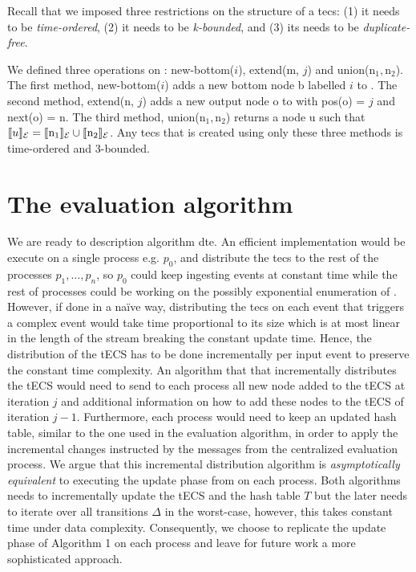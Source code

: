 Recall that we imposed three restrictions on the structure of a \acrshort{tecs}: (1) it needs to be \emph{time-ordered}, (2) it needs to be \emph{k-bounded}, and (3) its needs to be \emph{duplicate-free}.

We defined three operations on \tecs: new-bottom($i$), extend(m, $j$) and union($\text{n}_{1},\text{n}_{2}$). The first method, new-bottom($i$) adds a new bottom node b labelled $i$ to \tecs. The second method, extend(n, $j$) adds a new output node o to \tecs with pos(o) = $j$ and next(o) = n. The third method, union($\text{n}_{1},\text{n}_{2}$) returns a node u such that $\llbracket u \rrbracket_{\mathcal{E}} = \llbracket \text{n}_{1} \rrbracket_{\mathcal{E}} \cup \llbracket \text{n}_{2} \rrbracket_{\mathcal{E}}$. Any \acrshort{tecs} that is created using only these three methods is time-ordered and $3$-bounded.

\section{The evaluation algorithm}\label{sec:evaluation}

We are ready to description algorithm \acrshort{dte}. An efficient implementation would be execute \cite[Algorithm 1]{core} on a single process e.g. $p_{0}$, and distribute the \acrshort{tecs} \tecs to the rest of the processes $p_{1}, \ldots, p_{n}$, so $p_{0}$ could keep ingesting events at constant time while the rest of processes could be working on the possibly exponential enumeration of \tecs. However, if done in a na\"ive way, distributing the \acrshort{tecs} on each event that triggers a complex event would take time proportional to its size which is at most linear in the length of the stream breaking the constant update time. Hence, the distribution of the tECS has to be done incrementally per input event to preserve the constant time complexity. An algorithm that that incrementally distributes the tECS would need to send to each process all new node added to the tECS at iteration $j$ and additional information on how to add these nodes to the tECS of iteration $j-1$. Furthermore, each process would need to keep an updated hash table, similar to the one used in the evaluation algorithm, in order to apply the incremental changes instructed by the messages from the centralized evaluation process. We argue that this incremental distribution algorithm is \emph{asymptotically equivalent} to executing the update phase from \cite[Algorithm 1]{core} on each process. Both algorithms needs to incrementally update the tECS and the hash table $T$ but the later needs to iterate over all transitions $\Delta$ in the worst-case, however, this takes constant time under data complexity. Consequently, we choose to replicate the update phase of Algorithm 1 on each process and leave for future work a more sophisticated approach.

